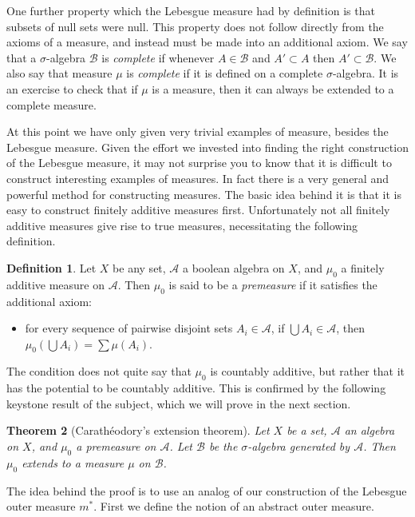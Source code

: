 \documentclass[11pt,oneside]{amsbook}
\theoremstyle{definition}
\theoremstyle{plain}
\newtheorem{thm}{Theorem}[section]
\theoremstyle{definition}
\newtheorem{defn}[thm]{Definition}
\theoremstyle{remark}
\numberwithin{equation}{section}
\numberwithin{figure}{section}
\begin{document}
One further property which the Lebesgue measure had by definition is that subsets of null sets were null. This property does not follow directly from the axioms of a measure, and instead must be made into an additional axiom. We say that a $\sigma$-algebra $\mathcal B$ is \emph{complete} if whenever $A\in\mathcal B$ and $A'\subset A$ then $A'\subset\mathcal B$. We also say that measure $\mu$ is \emph{complete} if it is defined on a complete $\sigma$-algebra. It is an exercise to check that if $\mu$ is a measure, then it can always be extended to a complete measure.

At this point we have only given very trivial examples of measure, besides the Lebesgue measure. Given the effort we invested into finding the right construction of the Lebesgue measure, it may not surprise you to know that it is difficult to construct interesting examples of measures. In fact there is a very general and powerful method for constructing measures. The basic idea behind it is that it is easy to construct finitely additive measures first. Unfortunately not all finitely additive measures give rise to true measures, necessitating the following definition.

\begin{defn}
  Let $X$ be any set, $\mathcal A$ a boolean algebra on $X$, and $\mu_0$ a finitely additive measure on $\mathcal A$. Then $\mu_0$ is said to be a \emph{premeasure} if it satisfies the additional axiom:
  \begin{itemize}
  \item for every sequence of pairwise disjoint sets $A_i\in\mathcal A$, if $\bigcup A_i\in\mathcal A$, then $\mu_0(\bigcup A_i)=\sum\mu(A_i)$.
  \end{itemize}
\end{defn}

The condition does not quite say that $\mu_0$ is countably additive, but rather that it has the potential to be countably additive. This is confirmed by the following keystone result of the subject, which we will prove in the next section.

\begin{thm}[Carath\'eodory's extension theorem]
  Let $X$ be a set, $\mathcal A$ an algebra on $X$, and $\mu_0$ a premeasure on $\mathcal A$. Let $\mathcal B$ be the $\sigma$-algebra generated by $\mathcal A$. Then $\mu_0$ extends to a measure $\mu$ on $\mathcal B$.
\end{thm}

The idea behind the proof is to use an analog of our construction of the Lebesgue outer measure $m^*$. First we define the notion of an abstract outer measure.
\end{document}
